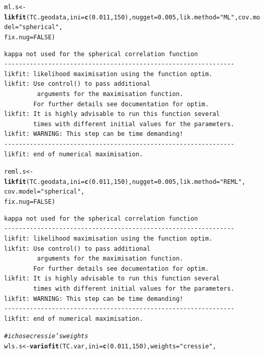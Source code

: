 \documentclass{article}\usepackage[]{graphicx}\usepackage[]{color}
\makeatletter
\newcommand{\hlnum}[1]{\textcolor[rgb]{0.686,0.059,0.569}{#1}}%
\newcommand{\hlstr}[1]{\textcolor[rgb]{0.192,0.494,0.8}{#1}}%
\newcommand{\hlcom}[1]{\textcolor[rgb]{0.678,0.584,0.686}{\textit{#1}}}%
\newcommand{\hlstd}[1]{\textcolor[rgb]{0.345,0.345,0.345}{#1}}%
\newcommand{\hlkwb}[1]{\textcolor[rgb]{0.69,0.353,0.396}{#1}}%
\newcommand{\hlkwc}[1]{\textcolor[rgb]{0.333,0.667,0.333}{#1}}%
\newcommand{\hlkwd}[1]{\textcolor[rgb]{0.737,0.353,0.396}{\textbf{#1}}}%
\newenvironment{kframe}{%
 \def\at@end@of@kframe{}%
 \ifinner\ifhmode%
  \def\at@end@of@kframe{\end{minipage}}%
  \begin{minipage}{\columnwidth}%
 \fi\fi%
 \def\FrameCommand##1{\hskip\@totalleftmargin \hskip-\fboxsep
 \colorbox{shadecolor}{##1}\hskip-\fboxsep
     \hskip-\linewidth \hskip-\@totalleftmargin \hskip\columnwidth}%
 \MakeFramed {\advance\hsize-\width
   \@totalleftmargin\z@ \linewidth\hsize
   \@setminipage}}%
 {\par\unskip\endMakeFramed%
 \at@end@of@kframe}
\newenvironment{knitrout}{}{} %
\makeatother
\begin{document}
\begin{enumerate}
\begin{enumerate}
\begin{knitrout}
\begin{kframe}
\begin{alltt}
\hlstd{ml.s} \hlkwb{<-} \hlkwd{likfit}\hlstd{(TC.geodata,} \hlkwc{ini} \hlstd{=} \hlkwd{c}\hlstd{(}\hlnum{0.011}\hlstd{,}\hlnum{150}\hlstd{),} \hlkwc{nugget} \hlstd{=} \hlnum{0.005}\hlstd{,} \hlkwc{lik.method} \hlstd{=} \hlstr{"ML"}\hlstd{,} \hlkwc{cov.model} \hlstd{=} \hlstr{"spherical"}\hlstd{,}
               \hlkwc{fix.nug} \hlstd{=} \hlnum{FALSE}\hlstd{)}
\end{alltt}
\begin{verbatim}
kappa not used for the spherical correlation function
---------------------------------------------------------------
likfit: likelihood maximisation using the function optim.
likfit: Use control() to pass additional
         arguments for the maximisation function.
        For further details see documentation for optim.
likfit: It is highly advisable to run this function several
        times with different initial values for the parameters.
likfit: WARNING: This step can be time demanding!
---------------------------------------------------------------
likfit: end of numerical maximisation.
\end{verbatim}
\begin{alltt}
\hlstd{reml.s} \hlkwb{<-} \hlkwd{likfit}\hlstd{(TC.geodata,} \hlkwc{ini} \hlstd{=} \hlkwd{c}\hlstd{(}\hlnum{0.011}\hlstd{,}\hlnum{150}\hlstd{),} \hlkwc{nugget} \hlstd{=} \hlnum{0.005}\hlstd{,} \hlkwc{lik.method} \hlstd{=} \hlstr{"REML"}\hlstd{,}
                  \hlkwc{cov.model} \hlstd{=} \hlstr{"spherical"}\hlstd{,}
               \hlkwc{fix.nug} \hlstd{=} \hlnum{FALSE}\hlstd{)}
\end{alltt}
\begin{verbatim}
kappa not used for the spherical correlation function
---------------------------------------------------------------
likfit: likelihood maximisation using the function optim.
likfit: Use control() to pass additional
         arguments for the maximisation function.
        For further details see documentation for optim.
likfit: It is highly advisable to run this function several
        times with different initial values for the parameters.
likfit: WARNING: This step can be time demanding!
---------------------------------------------------------------
likfit: end of numerical maximisation.
\end{verbatim}
\begin{alltt}
\hlcom{# i chose cressie's weights}
\hlstd{wls.s} \hlkwb{<-} \hlkwd{variofit}\hlstd{(TC.var,} \hlkwc{ini} \hlstd{=} \hlkwd{c}\hlstd{(}\hlnum{0.011}\hlstd{,}\hlnum{150}\hlstd{),} \hlkwc{weights} \hlstd{=} \hlstr{"cressie"}\hlstd{,}

\end{alltt}
\end{kframe}
\end{knitrout}
\end{enumerate}
\end{enumerate}
\end{document}
